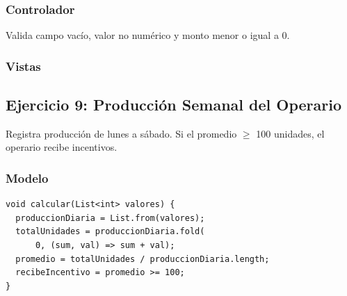 \documentclass{article}
\begin{document}
\subsubsection{Controlador}
Valida campo vacío, valor no numérico y monto menor o igual a 0.

\subsubsection{Vistas}
\begin{figure}[H]
\centering
\begin{minipage}{0.45\textwidth}\centering
\end{minipage}\hfill
\begin{minipage}{0.45\textwidth}\centering
\end{minipage}
\end{figure}

\newpage

\subsection{Ejercicio 9: Producción Semanal del Operario}
Registra producción de lunes a sábado. Si el promedio $\geq$ 100 unidades, el operario recibe incentivos.

\subsubsection{Modelo}
\begin{tcolorbox}[title=ProduccionSemanalModel]
\begin{lstlisting}
void calcular(List<int> valores) {
  produccionDiaria = List.from(valores);
  totalUnidades = produccionDiaria.fold(
      0, (sum, val) => sum + val);
  promedio = totalUnidades / produccionDiaria.length;
  recibeIncentivo = promedio >= 100;
}
\end{lstlisting}
\end{tcolorbox}
\end{document}

